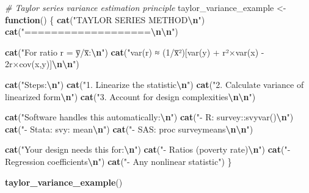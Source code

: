 \documentclass[
]{article}
\newenvironment{Shaded}{\begin{snugshade}}{\end{snugshade}}
\newcommand{\CommentTok}[1]{\textcolor[rgb]{0.56,0.35,0.01}{\textit{#1}}}
\newcommand{\ControlFlowTok}[1]{\textcolor[rgb]{0.13,0.29,0.53}{\textbf{#1}}}
\newcommand{\FunctionTok}[1]{\textcolor[rgb]{0.13,0.29,0.53}{\textbf{#1}}}
\newcommand{\NormalTok}[1]{#1}
\newcommand{\OtherTok}[1]{\textcolor[rgb]{0.56,0.35,0.01}{#1}}
\newcommand{\SpecialCharTok}[1]{\textcolor[rgb]{0.81,0.36,0.00}{\textbf{#1}}}
\newcommand{\StringTok}[1]{\textcolor[rgb]{0.31,0.60,0.02}{#1}}
\begin{document}
\begin{Shaded}
\begin{Highlighting}[]
\CommentTok{\# Taylor series variance estimation principle}
\NormalTok{taylor\_variance\_example }\OtherTok{\textless{}{-}} \ControlFlowTok{function}\NormalTok{() \{}
  \FunctionTok{cat}\NormalTok{(}\StringTok{"TAYLOR SERIES METHOD}\SpecialCharTok{\textbackslash{}n}\StringTok{"}\NormalTok{)}
  \FunctionTok{cat}\NormalTok{(}\StringTok{"===================}\SpecialCharTok{\textbackslash{}n\textbackslash{}n}\StringTok{"}\NormalTok{)}
  
  \FunctionTok{cat}\NormalTok{(}\StringTok{"For ratio r = y̅/x̅:}\SpecialCharTok{\textbackslash{}n}\StringTok{"}\NormalTok{)}
  \FunctionTok{cat}\NormalTok{(}\StringTok{"var(r) ≈ (1/x̅²)[var(y) + r²×var(x) {-} 2r×cov(x,y)]}\SpecialCharTok{\textbackslash{}n\textbackslash{}n}\StringTok{"}\NormalTok{)}
  
  \FunctionTok{cat}\NormalTok{(}\StringTok{"Steps:}\SpecialCharTok{\textbackslash{}n}\StringTok{"}\NormalTok{)}
  \FunctionTok{cat}\NormalTok{(}\StringTok{"1. Linearize the statistic}\SpecialCharTok{\textbackslash{}n}\StringTok{"}\NormalTok{)}
  \FunctionTok{cat}\NormalTok{(}\StringTok{"2. Calculate variance of linearized form}\SpecialCharTok{\textbackslash{}n}\StringTok{"}\NormalTok{)}
  \FunctionTok{cat}\NormalTok{(}\StringTok{"3. Account for design complexities}\SpecialCharTok{\textbackslash{}n\textbackslash{}n}\StringTok{"}\NormalTok{)}
  
  \FunctionTok{cat}\NormalTok{(}\StringTok{"Software handles this automatically:}\SpecialCharTok{\textbackslash{}n}\StringTok{"}\NormalTok{)}
  \FunctionTok{cat}\NormalTok{(}\StringTok{"{-} R: survey::svyvar()}\SpecialCharTok{\textbackslash{}n}\StringTok{"}\NormalTok{)}
  \FunctionTok{cat}\NormalTok{(}\StringTok{"{-} Stata: svy: mean}\SpecialCharTok{\textbackslash{}n}\StringTok{"}\NormalTok{)}
  \FunctionTok{cat}\NormalTok{(}\StringTok{"{-} SAS: proc surveymeans}\SpecialCharTok{\textbackslash{}n\textbackslash{}n}\StringTok{"}\NormalTok{)}
  
  \FunctionTok{cat}\NormalTok{(}\StringTok{"Your design needs this for:}\SpecialCharTok{\textbackslash{}n}\StringTok{"}\NormalTok{)}
  \FunctionTok{cat}\NormalTok{(}\StringTok{"{-} Ratios (poverty rate)}\SpecialCharTok{\textbackslash{}n}\StringTok{"}\NormalTok{)}
  \FunctionTok{cat}\NormalTok{(}\StringTok{"{-} Regression coefficients}\SpecialCharTok{\textbackslash{}n}\StringTok{"}\NormalTok{)}
  \FunctionTok{cat}\NormalTok{(}\StringTok{"{-} Any nonlinear statistic"}\NormalTok{)}
\NormalTok{\}}

\FunctionTok{taylor\_variance\_example}\NormalTok{()}
\end{Highlighting}
\end{Shaded}
\end{document}
